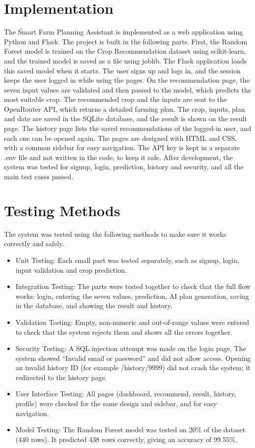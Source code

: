 \section{Implementation}
The Smart Farm Planning Assistant is implemented as a web application using Python and Flask. The project is built in the following parts. First, the Random Forest model is trained on the Crop Recommendation dataset using scikit-learn, and the trained model is saved as a file using joblib. The Flask application loads this saved model when it starts. The user signs up and logs in, and the session keeps the user logged in while using the pages. On the recommendation page, the seven input values are validated and then passed to the model, which predicts the most suitable crop. The recommended crop and the inputs are sent to the OpenRouter API, which returns a detailed farming plan. The crop, inputs, plan and date are saved in the SQLite database, and the result is shown on the result page. The history page lists the saved recommendations of the logged-in user, and each one can be opened again. The pages are designed with HTML and CSS, with a common sidebar for easy navigation. The API key is kept in a separate .env file and not written in the code, to keep it safe. After development, the system was tested for signup, login, prediction, history and security, and all the main test cases passed.
%
\section{Testing Methods}
The system was tested using the following methods to make sure it works correctly and safely.
\begin{itemize}
\item  Unit Testing: Each small part was tested separately, such as signup, login, input validation and crop prediction.

\item Integration Testing: The parts were tested together to check that the full flow works: login, entering the seven values, prediction, AI plan generation, saving in the database, and showing the result and history.

\item Validation Testing: Empty, non-numeric and out-of-range values were entered to check that the system rejects them and shows all the errors together.

\item  Security Testing: A SQL injection attempt was made on the login page. The system showed “Invalid email or password” and did not allow access. Opening an invalid history ID (for example /history/9999) did not crash the system; it redirected to the history page.

\item  User Interface Testing: All pages (dashboard, recommend, result, history, profile) were checked for the same design and sidebar, and for easy navigation.

\item Model Testing: The Random Forest model was tested on 20\% of the dataset (440 rows). It predicted 438 rows correctly, giving an accuracy of 99.55\%.
\end{itemize}
